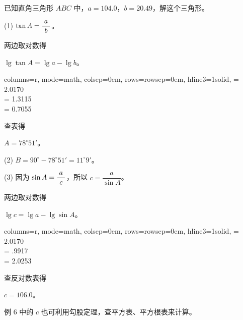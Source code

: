 \begin{enhancedline}
\liti 已知直角三角形 $ABC$ 中，$a = 104.0$，$b = 20.49$，解这个三角形。

\jie (1) $\tan A = \dfrac{\; a \;}{b}$。

两边取对数得

\hspace*{2em} $\lg{\tan A} = \lg{a} - \lg{b}$。

\hspace*{2em} \begin{tblr}[t]{
    columns={r, mode=math, colsep=0em},
    rows={rowsep=0em},
    hline{3}={1}{solid},
}
     = 2.0170 \\
     = 1.3115  \\
     = 0.7055
\end{tblr}

查表得

\hspace*{2em} $A = 78^\circ51'$。


(2) $B = 90^\circ - 78^\circ51' = 11^\circ9'$。

(3) 因为 $\sin A = \dfrac{\; a \;}{c}$，所以 $c = \dfrac{a}{\sin A}$。

两边取对数得

\hspace*{2em} $\lg{c} = \lg{a} - \lg{\sin A}$。

\hspace*{2em} \begin{tblr}[t]{
    columns={r, mode=math, colsep=0em},
    rows={rowsep=0em},
    hline{3}={1}{solid},
}
     = 2.0170 \\
     = .9917  \\
     = 2.0253
\end{tblr}

查反对数表得

\hspace*{2em} $c = 106.0$。
\end{enhancedline}

例 6 中的 $c$ 也可利用勾股定理，查平方表、平方根表来计算。



